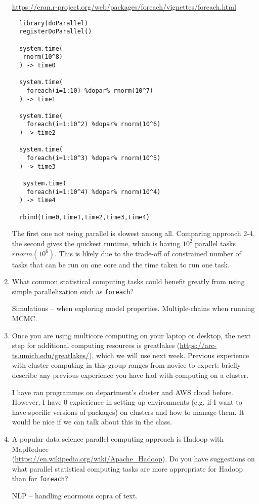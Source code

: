 \documentclass[12pt]{article}
\begin{document}
\begin{enumerate}
\url{https://cran.r-project.org/web/packages/foreach/vignettes/foreach.html}

\begin{verbatim} 
  library(doParallel)
  registerDoParallel()

  system.time(
   rnorm(10^8)
  ) -> time0

  system.time(
    foreach(i=1:10) %dopar% rnorm(10^7)
  ) -> time1

  system.time(
    foreach(i=1:10^2) %dopar% rnorm(10^6)
  ) -> time2

  system.time(
    foreach(i=1:10^3) %dopar% rnorm(10^5)
  ) -> time3

   system.time(
    foreach(i=1:10^4) %dopar% rnorm(10^4)
  ) -> time4
  
  rbind(time0,time1,time2,time3,time4)
\end{verbatim}

The first one not using parallel is slowest among all. Comparing approach 2-4, the second gives the quickest runtime, which is having $10^2$ parallel tasks $rnorm(10^6)$. This is likely due to the trade-off of constrained number of tasks that can be run on one core and the time taken to run one task.

\item What common statistical computing tasks could benefit greatly from using simple parallelization such as \texttt{foreach}?
  
Simulations -- when exploring model properties. Multiple-chains when running MCMC.

\item Once you are using multicore computing on your laptop or desktop, the next step for additional computing resources is greatlakes (\url{https://arc-ts.umich.edu/greatlakes/}), which we will use next week. Previous experience with cluster computing in this group ranges from novice to expert: briefly describe any previous experience you have had with computing on a cluster.

  I have ran programmes on department's cluster and AWS cloud before. However, I have 0 expierience in setting up environments (e.g. if I want to have specific versions of packages) on clusters and how to manage them. It would be nice if we can talk about this in the class.

\item A popular data science parallel computing approach is Hadoop with MapReduce\\
(\url{https://en.wikipedia.org/wiki/Apache_Hadoop}). Do you have suggestions on what parallel statistical computing tasks are more appropriate for Hadoop than for \texttt{foreach}?

NLP -- handling enormous copra of text.
  
\end{enumerate}
\end{document}
